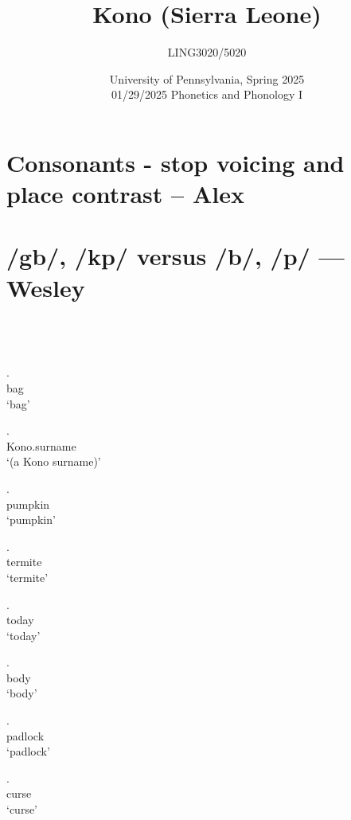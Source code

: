 \documentclass{assets/fieldnotes}
\title{Kono (Sierra Leone)}
\author{LING3020/5020}
\date{University of Pennsylvania, Spring 2025\\01/29/2025 Phonetics and Phonology I }
\begin{document}
\maketitle
\tableofcontents

\newpage 



\section{Consonants - stop voicing and place contrast -- Alex}



\section{/gb/, /kp/  versus /b/, /p/ --- Wesley}

\\
\\
\\

\exg. \\
bag\\
`bag'

\exg. \\
Kono.surname\\
`(a Kono surname)'

\exg. \\
pumpkin\\
`pumpkin'

\exg. \\
termite\\
`termite'

\exg. \\
today\\
`today'

\exg. \\
body\\
`body'

\exg. \\
padlock\\
`padlock'

\exg. \\
curse\\
`curse'
\end{document}
